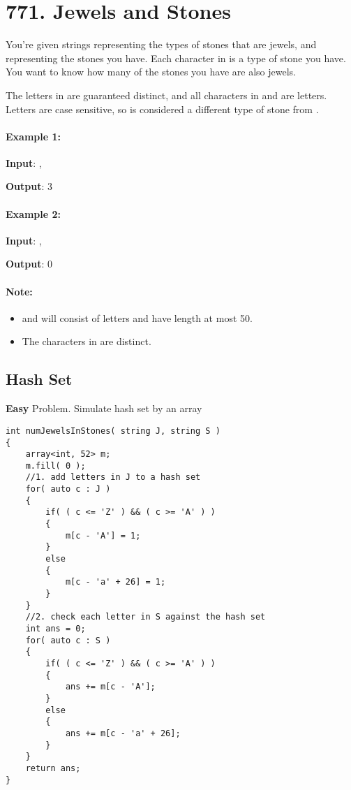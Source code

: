 \section{771. Jewels and Stones}
You're given strings  representing the types of stones that are jewels, and  representing the stones you have.  Each character in  is a type of stone you have.  You want to know how many of the stones you have are also jewels.

The letters in  are guaranteed distinct, and all characters in  and  are letters. Letters are case sensitive, so  is considered a different type of stone from .

\paragraph{Example 1:}

\begin{flushleft}
\textbf{Input}: , 

\textbf{Output}: 3
\end{flushleft}

\paragraph{Example 2:}

\begin{flushleft}
\textbf{Input}: , 

\textbf{Output}: 0
\end{flushleft}

\paragraph{Note:}

\begin{itemize}
\item {} and  will consist of letters and have length at most 50.

\item The characters in  are distinct.
\end{itemize}

\subsection{Hash Set}
\textbf{Easy} Problem. Simulate hash set by an array

\setcounter{lstlisting}{0}
\begin{lstlisting}[style=customc, caption={Hash Set}]
int numJewelsInStones( string J, string S )
{
    array<int, 52> m;
    m.fill( 0 );
    //1. add letters in J to a hash set
    for( auto c : J )
    {
        if( ( c <= 'Z' ) && ( c >= 'A' ) )
        {
            m[c - 'A'] = 1;
        }
        else
        {
            m[c - 'a' + 26] = 1;
        }
    }
    //2. check each letter in S against the hash set
    int ans = 0;
    for( auto c : S )
    {
        if( ( c <= 'Z' ) && ( c >= 'A' ) )
        {
            ans += m[c - 'A'];
        }
        else
        {
            ans += m[c - 'a' + 26];
        }
    }
    return ans;
}
\end{lstlisting}